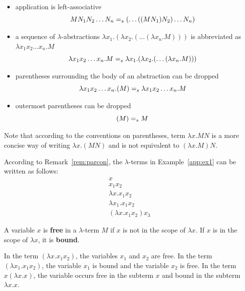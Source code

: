 \begin{remark} \label{rem:parcon}
\begin{itemize}
\item application is left-associative
$$MN_1 N_2 \dots N_n =_s (\dots ( (MN_1) N_2 ) \dots N_n)$$
\item  a sequence of $\lambda$-abstractions $\lambda x_1. (\lambda x_2. ( \dots (\lambda x_n. M) )  ) $ is abbreviated as \\ $\lambda x_1 x_2 \dots x_n.M$
$$\lambda x_1 x_2 \dots x_n.M =_s \lambda x_1. (\lambda x_2. ( \dots (\lambda x_n. M) )  )  $$
\item parentheses surrounding the body of an abstraction can be dropped
$$\lambda x_1 x_2 \dots x_n.(M) =_s \lambda x_1 x_2 \dots x_n.M$$
\item outermost parentheses can be dropped 
$$(M) =_s M$$
\end{itemize}
\end{remark}
Note that according to the conventions on parentheses, term $\lambda x. MN$ is a more concise way of writing $\lambda x. (MN)$ and is not equivalent to $(\lambda x. M)N$. 

\begin{example} According to Remark~\ref{rem:parcon}, the $\lambda$-terms in Example~\ref{app:ex1} can be written as follows:
\begin{align*}
& x \\
& x_1x_2 \\
& \lambda x. x_1 x_2 \\
& \lambda x_1. x_1 x_2 \\
& (\lambda x. x_1 x_2) x_3 
\end{align*}
\end{example}



\begin{definition} A variable $x$ is \textbf{free} in a $\lambda$-term $M$ if $x$ is not in the scope of $\lambda x$. If $x$ is in the scope of $\lambda x$, it is \textbf{bound}.
\end{definition}

\begin{example} In the term $ (\lambda x. x_1 x_2)$, the variables $x_1$ and $x_2$ are free. In the term $(\lambda x_1. x_1 x_2)$, the variable $x_1$ is bound and the variable $x_2$ is free. In the term $x(\lambda x.x)$, the variable occurs free in the subterm $x$ and bound in the subterm $\lambda x.x$. 
\end{example}

